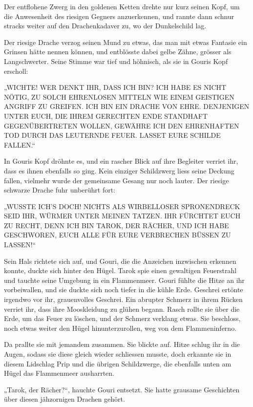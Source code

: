 \documentclass[10pt, a4paper, oneside]{book}
\begin{document}
Der entflohene Zwerg in den goldenen Ketten drehte nur kurz seinen Kopf, um die Anwesenheit des riesigen Gegners anzuerkennen, und rannte dann schnur stracks weiter auf den Drachenkadaver zu, wo der Dunkelschild lag.

Der riesige Drache verzog seinen Mund zu etwas, das man mit etwas Fantasie ein Grinsen hätte nennen können, und entblösste dabei gelbe Zähne, grösser als Langschwerter. Seine Stimme war tief und höhnisch, als sie in Gouris Kopf erscholl:

„WICHTE! WER DENKT IHR, DASS ICH BIN? ICH HABE ES NICHT NÖTIG, ZU SOLCH EHRENLOSEN MITTELN WIE EINEM GEISTIGEN ANGRIFF ZU GREIFEN. ICH BIN EIN DRACHE VON EHRE. DENJENIGEN UNTER EUCH, DIE IHREM GERECHTEN ENDE STANDHAFT GEGENÜBERTRETEN WOLLEN, GEWÄHRE ICH DEN EHRENHAFTEN TOD DURCH DAS LEUTERNDE FEUER. LASSET EURE SCHILDE FALLEN.“

In Gouris Kopf dröhnte es, und ein rascher Blick auf ihre Begleiter verriet ihr, dass es ihnen ebenfalls so ging. Kein einziger Schildzwerg liess seine Deckung fallen, vielmehr wurde der gemeinsame Gesang nur noch lauter. Der riesige schwarze Drache fuhr unberührt fort:

„WUSSTE ICH’S DOCH! NICHTS ALS WIRBELLOSER SPRONENDRECK SEID IHR, WÜRMER UNTER MEINEN TATZEN. IHR FÜRCHTET EUCH ZU RECHT, DENN ICH BIN TAROK, DER RÄCHER, UND ICH HABE GESCHWOREN, EUCH ALLE FÜR EURE VERBRECHEN BÜSSEN ZU LASSEN!“

Sein Hals richtete sich auf, und Gouri, die die Anzeichen inzwischen erkennen konnte, duckte sich hinter den Hügel. Tarok spie einen gewaltigen Feuerstrahl und tauchte seine Umgebung in ein Flammenmeer. Gouri fühlte die Hitze an ihr vorbeiwallen, und sie duckte sich noch tiefer in die kühle Erde. Geschrei ertönte irgendwo vor ihr, grauenvolles Geschrei. Ein abrupter Schmerz in ihrem Rücken verriet ihr, dass ihre Mooskleidung zu glühen begann. Rasch rollte sie über die Erde, um das Feuer zu löschen, und der Schmerz verklang etwas. Sie beschloss, noch etwas weiter den Hügel hinunterzurollen, weg von dem Flammeninferno.

Da prallte sie mit jemandem zusammen. Sie blickte auf. Hitze schlug ihr in die Augen, sodass sie diese gleich wieder schliessen musste, doch erkannte sie in diesem Lidschlag Prip und die übrigen Schildzwerge, die ebenfalls unten am Hügel das Flammenmeer ausharrten.

„Tarok, der Rächer?“, hauchte Gouri entsetzt. Sie hatte grausame Geschichten über diesen jähzornigen Drachen gehört.
\end{document}
